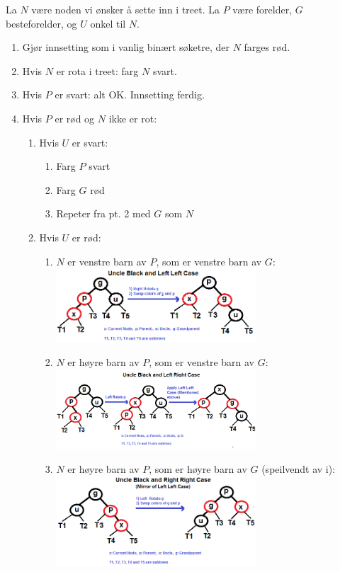 La $ N $ være noden vi ønsker å sette inn i treet. La $ P $ være forelder, $ G $ besteforelder, og $ U $ onkel til $ N $.
\begin{enumerate}
\item Gjør innsetting som i vanlig binært søketre, der $ N $ farges rød.
\item Hvis $ N $ er rota i treet: farg $ N $ svart. 
\item Hvis $ P $ er svart: alt OK. Innsetting ferdig. 
\item Hvis $ P $ er rød og $ N $ ikke er rot:
	\begin{enumerate}
		\item Hvis $ U $ er svart:
		\begin{enumerate}
			\item Farg $ P $ svart
			\item Farg $ G $ rød
			\item Repeter fra pt. 2 med $ G $ som $ N $
		\end{enumerate}
		\item Hvis $ U $ er rød:
		\begin{enumerate}
			\item $ N $ er venstre barn av $ P $, som er venstre barn av $ G $:\\
			\includegraphics[width=0.65\textwidth]{fig/rbt_ll.png}\\

			\item $ N $ er høyre barn av $ P $, som er venstre barn av $ G $:\\
			\includegraphics[width=0.65\textwidth]{fig/rbt_lr.png}\\
			
			\item $ N $ er høyre barn av $ P $, som er høyre barn av $ G $ (speilvendt av i):\\
			\includegraphics[width=0.65\textwidth]{fig/rbt_rr.png}\\
			

\end{enumerate}
\end{enumerate}
\end{enumerate}
